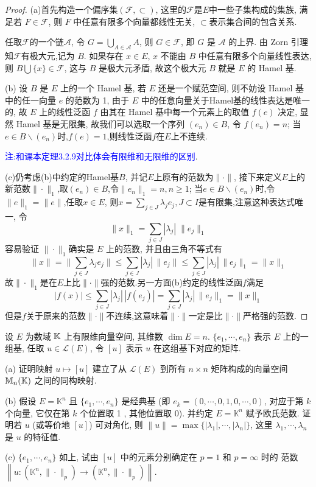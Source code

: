\begin{proof}
(a)首先构造一个偏序集$(\mathcal{F},\subset)$, 这里的$\mathcal{F}$是$E$中一些子集构成的集族,
满足若 $F\in\mathcal{F}$, 则 $F$ 中任意有限多个向量都线性无关, $\subset$表示集合间的包含关系.

任取$\mathcal{F}$的一个链$\mathcal{A}$,
令 $G=\bigcup_{A\in\mathcal{A}}A$, 则 $G\in\mathcal{F}$,
即 $G$ 是 $\mathcal{A}$ 的上界. 由 Zorn 引理知$\mathcal{F}$有极大元,记为 $B$.
如果存在 $x\in E$, $x$ 不能由 $B$ 中任意有限多个向量线性表达,
则 $B\bigcup\{x\}\in\mathcal{F}$, 这与 $B$ 是极大元矛盾, 故这个极大元 $B$ 就是 $E$ 的 Hamel 基.

(b) 设 $B$ 是 $E$ 上的一个 Hamel 基, 若 $E$ 还是一个赋范空间,
则不妨设 Hamel 基中的任一向量 $e$ 的范数为 1,
由于 $E$ 中的任意向量关于Hamel基的线性表达是唯一的,
故 $E$ 上的线性泛函 $f$ 由其在 Hamel 基中每一个元素上的取值 $f(e)$ 决定,
显然 Hamel 基是无限集, 故我们可以选取一个序列 $(e_n)\in B$,
令 $f(e_n)=n$; 当$e\in B\backslash(e_n)$时,$f(e)=1$,则线性泛函$f$在$E$上不连续.

\textcolor{blue}{注:和课本定理3.2.9对比体会有限维和无限维的区别}.

(c)仍考虑(b)中约定的Hamel基$B$, 并记$E$上原有的范数为$\|\cdot\|$,
接下来定义$E$上的新范数$\|\cdot\|_1$,取$(e_n)\in B$,令$\|e_n\|_1=n,n\geq 1$;
当$e\in B\backslash(e_n)$时,令$\|e\|_1=\|e\|$,任取$x\in E$,
则$x=\sum_{j\in J}\lambda_je_j,J\subset I$是有限集,注意这种表达式唯一,
令
\[\|x\|_1=\sum_{j\in J}|\lambda_j|\;\|e_j\|_1\]
容易验证 $\|\cdot\|_1$确实是 $E$ 上的范数, 并且由三角不等式有
\[\|x\|=\|\sum_{j\in J}\lambda_je_j\|\leq\sum_{j\in J}|\lambda_j|\,\|e_j\|\leq\sum_{j\in J}|\lambda_j|\,\|e_j\|_1=\|x\|_1\]
故$\|\cdot\|_1$是在$E$上比$\|\cdot\|$强的范数.另一方面(b)约定的线性泛函$f$满足
\[|f(x)|\leq\sum_{j\in J}|\lambda_j|\,|f(e_j)|=\sum_{j\in J}|\lambda_j|\,\|e_j\|_1=\|x\|_1\]
但是$f$关于原来的范数$\|\cdot\|$不连续,这意味着$\|\cdot\|$一定是比$\|\cdot\|$严格强的范数.
\end{proof}



\begin{exercise}
    设 $E$ 为数域 $\mathbb{K}$ 上有限维向量空间, 其维数 $\dim E=n$.
    $\{e_{1},\cdots,e_{n}\}$ 表示 $E$ 上的一组基, 任取 $u\in\mathcal{L}(E)$, 令 $[u]$ 表示 $u$ 在这组基下对应的矩阵.

    (a) 证明映射 $u \mapsto[u]$ 建立了从 $\mathcal{L}(E)$ 到所有 $n \times n$ 矩阵构成的向量空间 
    $\mathbb{M}_{n}(\mathbb{K})$ 之间的同构映射.

    (b) 假设 $E=\mathbb{K}^{n}$ 且 $\{e_1,\cdots,e_n\}$ 是经典基 
    (即 $e_{k}=(0, \cdots, 0,1,0, \cdots, 0)$, 对应于第 $k$ 个向量, 
    它仅在第 $k$ 个位置取 1 , 其他位置取 $0$). 
    并约定 $E=\mathbb{K}^{n}$ 赋予欧氏范数. 证明若 $u$ (或等价地 $[u]$) 可对角化, 
    则 $\|u\|=\max\{|\lambda_{1}|,\cdots,|\lambda_{n}|\}$, 这里 $\lambda_{1}, \cdots, \lambda_{n}$ 是 $u$ 的特征值.

    (c) $\{e_{1}, \cdots, e_{n}\}$ 如上, 试由 $[u]$ 中的元素分别确定在 $p=1$ 和 $p=\infty$ 时的
    范数 $\left\|u:\left(\mathbb{K}^{n},\|\cdot\|_{p}\right)\rightarrow\left(\mathbb{K}^{n},\|\cdot\|_{p}\right)\right\|$.
\end{exercise}

